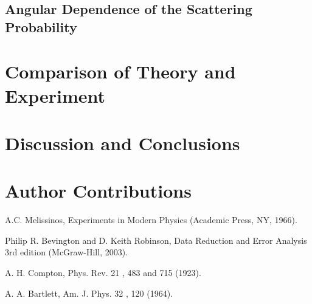 \documentclass[%
 reprint,
 amsmath,amssymb,
 aps,
 pra,
]{revtex4-1}
\begin{document}
\subsection{Angular Dependence of the Scattering Probability}

\section{Comparison of Theory and Experiment}

\section{Discussion and Conclusions}

\section{Author Contributions}

\begin{thebibliography}{4}
	
	A.C. Melissinos, Experiments in Modern Physics (Academic Press, NY, 1966).
	
	Philip R. Bevington and D. Keith Robinson, Data Reduction and Error Analysis 3rd edition (McGraw-Hill, 2003).
	
	A. H. Compton, Phys. Rev. 21 , 483 and 715 (1923).
	
	A. A. Bartlett, Am. J. Phys. 32 , 120 (1964).

\end{thebibliography}
\end{document}
